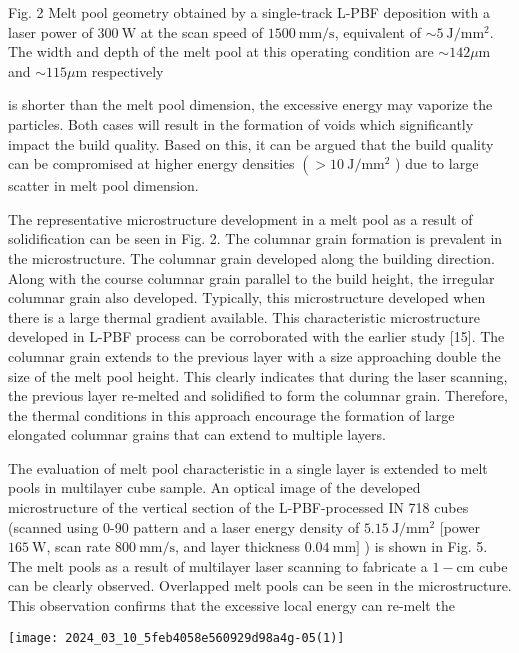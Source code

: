 \documentclass[10pt]{article}
\begin{document}
Fig. 2 Melt pool geometry obtained by a single-track L-PBF deposition with a laser power of $300 \mathrm{~W}$ at the scan speed of $1500 \mathrm{~mm} / \mathrm{s}$, equivalent of $\sim 5 \mathrm{~J} / \mathrm{mm}^{2}$. The width and depth of the melt pool at this operating condition are $\sim 142 \mu \mathrm{m}$ and $\sim 115 \mu \mathrm{m}$ respectively

is shorter than the melt pool dimension, the excessive energy may vaporize the particles. Both cases will result in the formation of voids which significantly impact the build quality. Based on this, it can be argued that the build quality can be compromised at higher energy densities $\left(>10 \mathrm{~J} / \mathrm{mm}^{2}\right.$ ) due to large scatter in melt pool dimension.

The representative microstructure development in a melt pool as a result of solidification can be seen in Fig. 2. The columnar grain formation is prevalent in the microstructure. The columnar grain developed along the building direction. Along with the course columnar grain parallel to the build height, the irregular columnar grain also developed. Typically, this microstructure developed when there is a large thermal gradient available. This characteristic microstructure developed in L-PBF process can be corroborated with the earlier study [15]. The columnar grain extends to the previous layer with a size approaching double the size of the melt pool height. This clearly indicates that during the laser scanning, the previous layer re-melted and solidified to form the columnar grain. Therefore, the thermal conditions in this approach encourage the formation of large elongated columnar grains that can extend to multiple layers.

The evaluation of melt pool characteristic in a single layer is extended to melt pools in multilayer cube sample. An optical image of the developed microstructure of the vertical section of the L-PBF-processed IN 718 cubes (scanned using 0-90 pattern and a laser energy density of $5.15 \mathrm{~J} / \mathrm{mm}^{2}$ [power $165 \mathrm{~W}$, scan rate $800 \mathrm{~mm} / \mathrm{s}$, and layer thickness $0.04 \mathrm{~mm}]$ ) is shown in Fig. 5. The melt pools as a result of multilayer laser scanning to fabricate a $1-\mathrm{cm}$ cube can be clearly observed. Overlapped melt pools can be seen in the microstructure. This observation confirms that the excessive local energy can re-melt the

\begin{center}
\texttt{[image: 2024\_03\_10\_5feb4058e560929d98a4g-05(1)]}
\end{center}
\end{document}
